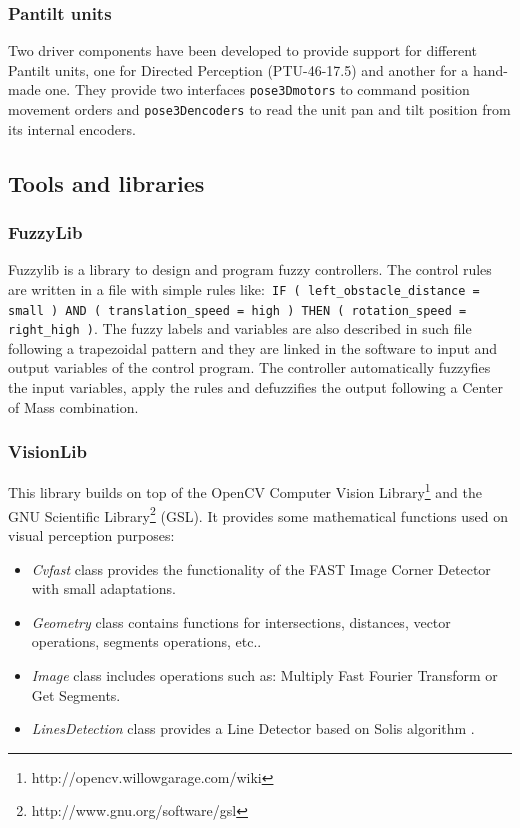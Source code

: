 \documentclass[twocolumn]{svjour3}          %
\begin{document}
\subsubsection{Pantilt units}

Two driver components have been developed to provide support for different Pantilt units, one for Directed Perception (PTU-46-17.5) and another for a hand-made one. They provide two interfaces \texttt{pose3Dmotors} to command position movement orders and \texttt{pose3Dencoders} to read the unit pan and tilt position from its internal encoders.

\subsection{Tools and libraries}
\label{sec:tools}

\subsubsection{FuzzyLib}

Fuzzylib is a library to design and program fuzzy controllers. The control rules are written in a file with simple rules like:\texttt{ IF ( left\_obstacle\_distance = small ) AND ( translation\_speed = high ) THEN ( rotation\_speed = right\_high )}. 
The fuzzy labels and variables are also described in such file following a trapezoidal pattern and they are linked in the software to input and output variables of the control program. The controller automatically fuzzyfies the input variables, apply the rules and defuzzifies the output following a Center of Mass combination.

\subsubsection{VisionLib}
\label{subsec:visionlib}

This library builds on top of the OpenCV Computer Vision Library\footnote{http://opencv.willowgarage.com/wiki} and the GNU Scientific Library\footnote{http://www.gnu.org/software/gsl} (GSL). It provides some mathematical functions used on visual perception purposes:

\begin{itemize} 
\item \textit{Cvfast} class provides the functionality of the FAST Image Corner Detector with small adaptations.
\item \textit{Geometry} class contains functions for intersections, distances, vector operations, segments operations, etc..
\item \textit{Image} class includes operations such as: Multiply Fast Fourier Transform or Get Segments.
\item \textit{LinesDetection} class provides a Line Detector based on Solis algorithm \cite{solis09}.
\end{itemize}
\end{document}

